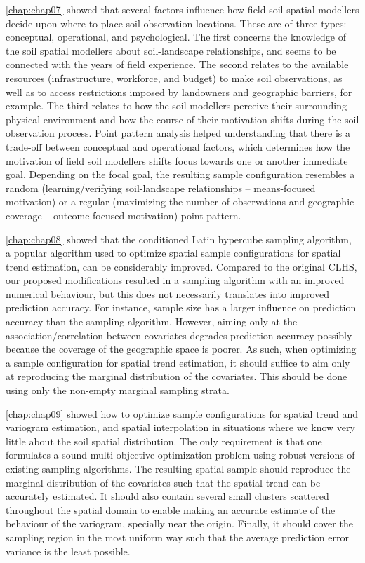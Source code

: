 \autoref{chap:chap07} showed that several factors influence how field soil spatial modellers decide upon where 
to place soil observation locations. These are of three types: conceptual, operational, and psychological. The 
first concerns the knowledge of the soil spatial modellers about soil-landscape relationships, and seems to be 
connected with the years of field experience. The second relates to the available resources (infrastructure, 
workforce, and budget) to make soil observations, as well as to access restrictions imposed by landowners and 
geographic barriers, for example. The third relates to how the soil modellers perceive their surrounding 
physical environment and how the course of their motivation shifts during the soil observation process. Point 
pattern analysis helped understanding that there is a trade-off between conceptual and operational factors, 
which determines how the motivation of field soil modellers shifts focus towards one or another immediate goal. 
Depending on the focal goal, the resulting sample configuration resembles a random (learning/verifying 
soil-landscape relationships -- means-focused motivation) or a regular (maximizing the number of observations 
and geographic coverage -- outcome-focused motivation) point pattern.

\autoref{chap:chap08} showed that the conditioned Latin hypercube sampling algorithm, a popular algorithm used 
to optimize spatial sample configurations for spatial trend estimation, can be considerably improved. Compared 
to the original CLHS, our proposed modifications resulted in a sampling algorithm with an improved numerical 
behaviour, but this does not necessarily translates into improved prediction accuracy. For instance, sample 
size has a larger influence on prediction accuracy than the sampling algorithm. However, aiming only at the 
association/correlation between covariates degrades prediction accuracy possibly because the coverage of the 
geographic space is poorer. As such, when optimizing a sample configuration for spatial trend estimation, it 
should suffice to aim only at reproducing the marginal distribution of the covariates. This should be done 
using only the non-empty marginal sampling strata.

\autoref{chap:chap09} showed how to optimize sample configurations for spatial trend and variogram estimation, 
and spatial interpolation in situations where we know very little about the soil spatial distribution. The only 
requirement is that one formulates a sound multi-objective optimization problem using robust versions of 
existing sampling algorithms. The resulting spatial sample should reproduce the marginal distribution of the 
covariates such that the spatial trend can be accurately estimated. It should also contain several small 
clusters scattered throughout the spatial domain to enable making an accurate estimate of the behaviour of the 
variogram, specially near the origin. Finally, it should cover the sampling region in the most uniform way such 
that the average prediction error variance is the least possible.

